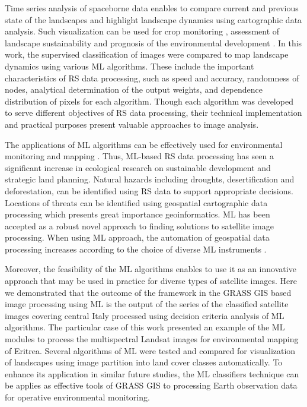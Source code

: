 \documentclass[sn-mathphys-num]{sn-jnl}%
\theoremstyle{thmstyleone}%
\theoremstyle{thmstyletwo}%
\theoremstyle{thmstylethree}%
\begin{document}
Time series analysis of spaceborne data enables to compare current and previous state of the landscapes and highlight landscape dynamics using cartographic data analysis. Such visualization can be used for crop monitoring \cite{OUATTARA2025104783,LIEPA2024101230}, assessment of landscape sustainability \cite{6573358,Demichelis} and prognosis of {the environmental} development \cite{Subramani,Sprigg2025}. In this work, the supervised {classification} of { images} were {compared} to map landscape dynamics using various ML {algorithms}. These include the important characteristics of RS data processing, such as speed and accuracy, randomness of nodes, analytical determination of the output weights, and dependence distribution of pixels for each algorithm. Though each{ }algorithm was developed to serve different objectives of{ }RS data processing, their technical implementation and practical purposes present valuable approaches to{ }image analysis. 

The{ }applications {of ML algorithms }can be effectively used for environmental monitoring and mapping \cite{Ezugwu}. {Thus, ML-based RS data processing has seen a significant increase in ecological research on sustainable development and strategic land planning. Natural hazards including droughts, desertification and deforestation, can be identified using RS data to support appropriate decisions. Locations of threats can be identified using geospatial cartographic data processing which presents great importance geoinformatics. ML has been accepted as a robust novel approach to finding solutions to satellite image processing. }When using ML approach, the automation of geospatial data processing increases according to the choice of diverse ML instruments \cite{Basu}. 

Moreover, the feasibility of the ML algorithms enables to use it as an innovative approach that may be used in practice for diverse types of satellite images. Here we demonstrated that the outcome of the framework in the GRASS GIS based image processing using ML is the output of the series of the classified satellite images covering central Italy processed using decision criteria analysis of ML algorithms. The particular case of this work presented an example of the ML modules to process the multispectral Landsat images for environmental mapping of Eritrea. Several algorithms of ML were tested and compared for visualization of landscapes using image partition into land cover classes automatically. To enhance its application in similar future studies, the ML classifiers technique can be applies as effective tools of GRASS GIS to processing Earth observation data for operative environmental monitoring.
\end{document}
